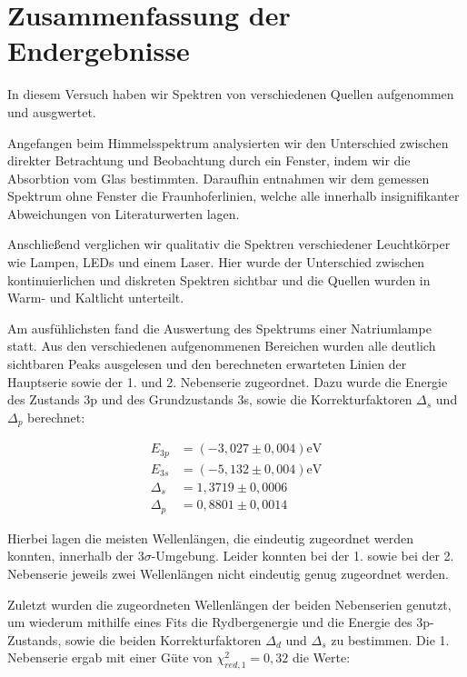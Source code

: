 \documentclass{article}
\begin{document}
\section{Zusammenfassung der Endergebnisse}

In diesem Versuch haben wir Spektren von verschiedenen Quellen aufgenommen und ausgwertet.

Angefangen beim Himmelsspektrum analysierten wir den Unterschied zwischen direkter Betrachtung und Beobachtung durch ein Fenster, indem wir die Absorbtion vom Glas bestimmten. Daraufhin entnahmen wir dem gemessen Spektrum ohne Fenster die Fraunhoferlinien, welche alle innerhalb insignifikanter Abweichungen von Literaturwerten lagen. 

Anschließend verglichen wir qualitativ die Spektren verschiedener Leuchtkörper wie Lampen, LEDs und einem Laser. Hier wurde der Unterschied zwischen kontinuierlichen und diskreten Spektren sichtbar und die Quellen wurden in Warm- und Kaltlicht unterteilt.

Am ausfühlichsten fand die Auswertung des Spektrums einer Natriumlampe statt. Aus den verschiedenen aufgenommenen Bereichen wurden alle deutlich sichtbaren Peaks ausgelesen und den berechneten erwarteten Linien der Hauptserie sowie der 1. und 2. Nebenserie zugeordnet. Dazu wurde die Energie des Zustands 3p und des Grundzustands 3s, sowie die Korrekturfaktoren $\Delta_s$ und $\Delta_p$ berechnet:

\begin{equation}
    \begin{split}
        E_{3p} &= (-3,027 \pm 0,004) \text{eV} \\
        E_{3s} &= (-5,132 \pm 0,004) \text{eV} \\
        \Delta_s &= 1,3719 \pm 0,0006 \\
        \Delta_p &= 0,8801 \pm 0,0014
    \end{split}
\end{equation}

Hierbei lagen die meisten Wellenlängen, die eindeutig zugeordnet werden konnten, innerhalb der $3\sigma$-Umgebung. Leider konnten bei der 1. sowie bei der 2. Nebenserie jeweils zwei Wellenlängen nicht eindeutig genug zugeordnet werden. 

Zuletzt wurden die zugeordneten Wellenlängen der beiden Nebenserien genutzt, um wiederum mithilfe eines Fits die Rydbergenergie und die Energie des 3p-Zustands, sowie die beiden Korrekturfaktoren $\Delta_d$ und $\Delta_s$ zu bestimmen. Die 1. Nebenserie ergab mit einer Güte von $\chi^2_{red,1} = 0,32$ die Werte:
\end{document}
